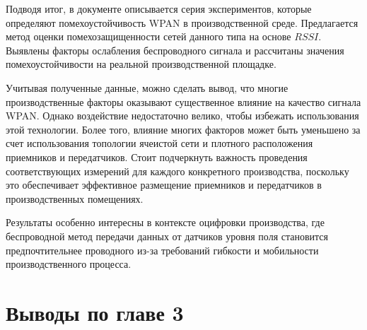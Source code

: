 Подводя итог, в документе описывается серия экспериментов, которые определяют помехоустойчивость WPAN в производственной среде. Предлагается метод оценки помехозащищенности сетей данного типа на основе $RSSI$. Выявлены факторы ослабления беспроводного сигнала и рассчитаны значения помехоустойчивости на реальной производственной площадке.

Учитывая полученные данные, можно сделать вывод, что многие производственные факторы оказывают существенное влияние на качество сигнала WPAN. Однако воздействие недостаточно велико, чтобы избежать использования этой технологии. Более того, влияние многих факторов может быть уменьшено за счет использования топологии ячеистой сети и плотного расположения приемников и передатчиков. Стоит подчеркнуть важность проведения соответствующих измерений для каждого конкретного производства, поскольку это обеспечивает эффективное размещение приемников и передатчиков в производственных помещениях.

Результаты особенно интересны в контексте оцифровки производства, где беспроводной метод передачи данных от датчиков уровня поля становится предпочтительнее проводного из-за требований гибкости и мобильности производственного процесса.

\section{Выводы по главе 3}

\FloatBarrier